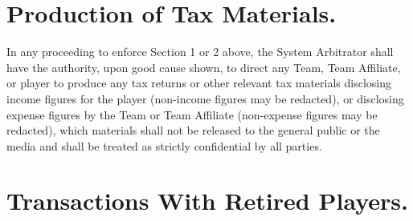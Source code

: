 \documentclass[
]{book}
\begin{document}
\hypertarget{production-of-tax-materials.}{%
\section{Production of Tax Materials.}\label{production-of-tax-materials.}}

In any proceeding to enforce Section 1 or 2 above, the System Arbitrator shall have the authority, upon good cause shown, to direct any Team, Team Affiliate, or player to produce any tax returns or other relevant tax materials disclosing income figures for the player (non-income figures may be redacted), or disclosing expense figures by the Team or Team Affiliate (non-expense figures may be redacted), which materials shall not be released to the general public or the media and shall be treated as strictly confidential by all parties.

\hypertarget{transactions-with-retired-players.}{%
\section{Transactions With Retired Players.}\label{transactions-with-retired-players.}}
\end{document}
